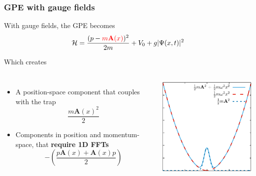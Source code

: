 \documentclass{beamer}
\begin{document}
\begin{frame}
\frametitle{GPE with gauge fields}
With gauge fields, the GPE becomes
\begin{equation*}
\mathcal{ H} = \frac{(p-{\color{red}{m\mathbf{A}(x)}} )^2}{2m} + V_0 + g|\Psi(x,t)|^2
\end{equation*}

Which creates

\begin{columns}
\begin{itemize}
\item A position-space component that couples with the trap
$$
\frac{m\mathbf{A}(x)^2}{2}
$$

\item Components in position and momentum-space, that \textbf{require 1D FFTs}
$$
-\left(\frac{p\mathbf{A}(x) + \mathbf{A}(x)p}{2}\right)
$$
\end{itemize}
\includegraphics[width=1.1\textwidth]{check.png}
\end{columns}

\end{frame}
\end{document}
